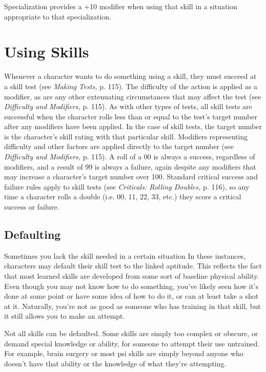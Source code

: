 Specialization provides a +10 modifier when using 
that skill in a situation appropriate to that specialization.

\section{Using Skills}

Whenever a character wants to do something using 
a skill, they must succeed at a skill test (see \textit{Making }
\textit{Tests,} p. 115). The difficulty of the action is applied 
as a modifier, as are any other extenuating circumstances
that may affect the test (see \textit{Difficulty and }
\textit{Modifiers,} p. 115). As with other types of tests, all skill 
tests are successful when the character rolls less than 
or equal to the test's target number after any modifiers
have been applied. In the case of skill tests, the
target number is the character's skill rating with that 
particular skill. Modifiers representing difficulty and 
other factors are applied directly to the target number 
(see \textit{Difficulty and Modifiers,} p. 115). A roll of a 00 is 
always a success, regardless of modifiers, and a result 
of 99 is always a failure, again despite any modifiers 
that may increase a character's target number over 
100. Standard critical success and failure rules apply 
to skill tests (see \textit{Criticals: Rolling Doubles,} p. 116), 
so any time a character rolls a double (i.e. 00, 11, 22, 
33, etc.) they score a critical success or failure.

\subsection{Defaulting}

Sometimes you lack the skill needed in a certain situation
In these instances, characters may default their
skill test to the linked aptitude. This reflects the fact 
that most learned skills are developed from some sort 
of baseline physical ability. Even though you may not 
know how to do something, you've likely seen how 
it's done at some point or have some idea of how to 
do it, or can at least take a shot at it. Naturally, you're 
not as good as someone who has training in that skill, 
but it still allows you to make an attempt.

Not all skills can be defaulted. Some skills are 
simply too complex or obscure, or demand special 
knowledge or ability, for someone to attempt their 
use untrained. For example, brain surgery or most psi 
skills are simply beyond anyone who doesn't have that 
ability or the knowledge of what they're attempting.

